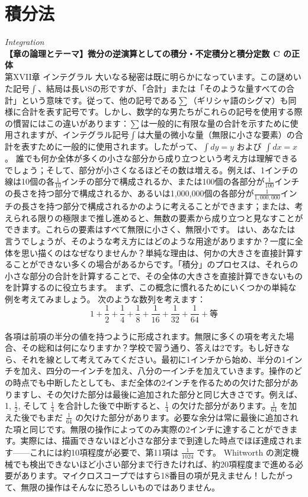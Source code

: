 \documentclass[a4paper,11pt,openany]{ltjsbook}
\begin{document}
\chapter{積分法}
\noindent\textit{\large Integration}\\[2mm]
\noindent\textbf{\small 【章の論理とテーマ】微分の逆演算としての積分・不定積分と積分定数 C の正体}\\[4mm]
第XVII章 インテグラル
大いなる秘密は既に明らかになっています。この謎めいた記号$\displaystyle \int$、結局は長いSの形ですが、「合計」または「そのような量すべての合計」という意味です。従って、他の記号である$\sum$（ギリシャ語のシグマ）も同様に合計を表す記号です。しかし、数学的な男たちがこれらの記号を使用する際の慣習にはこの違いがあります：$\sum$は一般的に有限な量の合計を示すために使用されますが、インテグラル記号$\displaystyle \int$は大量の微小な量（無限に小さな要素）の合計を表すために一般的に使用されます。したがって、$\displaystyle \int dy = y$ および $\displaystyle \int dx = x$。
誰でも何か全体が多くの小さな部分から成り立つという考え方は理解できるでしょう；そして、部分が小さくなるほどその数は増える。例えば、1インチの線は10個の各$\frac{1}{10}$インチの部分で構成されるか、または100個の各部分が$\frac{1}{100}$インチの長さを持つ部分で構成されるか、あるいは1,000,000個の各部分が$\frac{1}{1,000,000}$インチの長さを持つ部分で構成されるかのように考えることができます；または、考えられる限りの極限まで推し進めると、無数の要素から成り立つと見なすことができます。これらの要素はすべて無限に小さく、無限小です。
はい、あなたは言うでしょうが、そのような考え方にはどのような用途がありますか？一度に全体を思い描くのはなぜなりませんか？単純な理由は、何かの大きさを直接計算することができない多くの場合があるからです。「積分」のプロセスは、それらの小さな部分の合計を計算することで、その全体の大きさを直接計算できないものを計算するのに役立ちます。
まず、この概念に慣れるためにいくつかの単純な例を考えてみましょう。
次のような数列を考えます：
\[
1 + \frac{1}{2} + \frac{1}{4} + \frac{1}{8}
  + \frac{1}{16} + \frac{1}{32} + \frac{1}{64} + \text{等}
\]

各項は前項の半分の値を持つように形成されます。無限に多くの項を考えた場合、その総和は何になりますか？学校で習う通り、答えは2です。もし好きなら、それを線として考えてみてください。最初に1インチから始め、半分の1インチを加え、四分の一インチを加え、八分の一インチを加えていきます。操作のどの時点でも中断したとしても、まだ全体の2インチを作るための欠けた部分がありますし、その欠けた部分は最後に追加された部分と同じ大きさです。例えば、1, $\frac{1}{2}$, そして $\frac{1}{4}$ を合計した後で中断すると、$\frac{1}{4}$ の欠けた部分があります。$\frac{1}{64}$ を加えた後でもまだ $\frac{1}{64}$ の欠けた部分があります。必要な余分は常に最後に追加された項と同じです。無限の操作によってのみ実際の2インチに達することができます。実際には、描画できないほど小さな部分まで到達した時点でほぼ達成されます——これには約10項程度が必要で、第11項は $\frac{1}{1024}$ です。 Whitworth の測定機械でも検出できないほど小さい部分まで行きたければ、約20項程度まで進める必要があります。マイクロスコープではすら18番目の項が見えません！したがって、無限の操作はそんなに恐ろしいものではありません。
\end{document}
